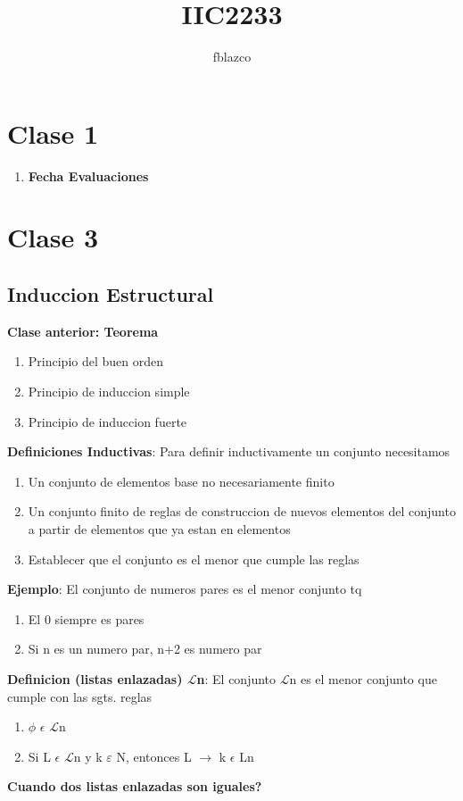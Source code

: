 \documentclass{article}
\author{fblazco}
\title{IIC2233}
\begin{document}
	\maketitle
    \section{Clase 1}
    \begin{enumerate}
        \item \textbf{Fecha Evaluaciones}
    \end{enumerate}    
          
    \section{Clase 3}
    \subsection{Induccion Estructural}
        \textbf{Clase anterior: Teorema}
        \begin{enumerate}
            \item Principio del buen orden
            \item Principio de induccion simple
            \item Principio de induccion fuerte
        \end{enumerate}
        \textbf{Definiciones Inductivas}:
        Para definir inductivamente un conjunto necesitamos
        \begin{enumerate}
            \item Un conjunto de elementos base no necesariamente finito
            \item Un conjunto finito de reglas de construccion de nuevos elementos del conjunto a partir de elementos que ya estan en elementos
            \item Establecer que el conjunto es el menor que cumple las reglas
        \end{enumerate} 
        \textbf{Ejemplo}:
        El conjunto de numeros pares es el menor conjunto tq
        \begin{enumerate}
            \item El 0 siempre es pares
            \item Si n es un numero par, n+2 es numero par
        \end{enumerate}
        \textbf{Definicion (listas enlazadas) $\mathcal{L}$n}: El conjunto $\mathcal{L}$n es el menor conjunto que cumple con las sgts. reglas
        \begin{enumerate}
            \item $\phi$ $ \epsilon $ $\mathcal{L}$n
            \item Si L $\epsilon $ $\mathcal{L}$n y k $\varepsilon $ N, entonces L $\rightarrow$ k $\epsilon $ Ln
        \end{enumerate}
        \textbf{Cuando dos listas enlazadas son iguales?}
\end{document}
